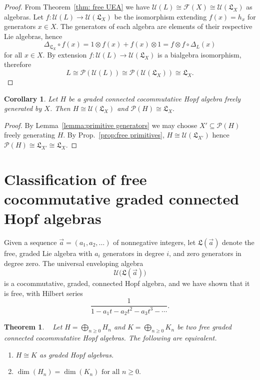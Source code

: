 \documentclass[11pt]{amsart}
\newtheorem{thm}{Theorem}
\newtheorem{corollary}[theorem]{Corollary}
\theoremstyle{definition}
\numberwithin{equation}{section}
\begin{document}
\begin{proof}
   From Theorem~\ref{thm: free UEA} we have $\mathcal{U}(L) \cong \mathcal{F}(X) \cong \mathcal{U}(\mathfrak{L}_X)$ as algebras. Let $f:\mathcal{U}(L) \to \mathcal{U}(\mathfrak{L}_X)$ be the isomorphism extending $f(x)=h_x$ for generators $x \in X$. The generators of each algebra are elements of their respective Lie algebras, hence 
    \[
    \Delta_{\mathfrak{L}_X} \circ f(x)=1 \otimes f(x) + f(x) \otimes 1 = f \otimes f \circ \Delta_L(x) 
    \]
    for all $x \in X$. By extension $f:\mathcal{U}(L) \to \mathcal{U}(\mathfrak{L}_X)$ is a bialgebra isomorphism, therefore
    \[
    L \cong \mathcal{P}(\mathcal{U}(L)) \cong \mathcal{P}(\mathcal{U}(\mathfrak{L}_X)) \cong \mathfrak{L}_X.
    \]
\end{proof}

\begin{corollary}
    Let $H$ be a graded connected cocommutative Hopf algebra freely generated by $X$. Then $H \cong \mathcal{U}(\mathfrak{L}_X)$ and $\mathcal{P}(H)\cong \mathfrak{L}_X.$
\label{cor: free hopf primitives}
\end{corollary}
\begin{proof}
    By Lemma~\ref{lemma:primitive generators} we may choose $X'\subseteq \mathcal{P}(H)$ freely generating $H$. By Prop.~\ref{prop:free primitives}, $H\cong \mathcal{U}(\mathfrak{L}_{X'})$ hence $\mathcal{P}(H)\cong \mathfrak{L}_{X'}\cong \mathfrak{L}_X.$
\end{proof}

\section{Classification of free cocommutative graded connected Hopf algebras} 

Given a sequence $\vec{a} = (a_{1}, a_{2}, \ldots)$ of nonnegative integers, let $\mathfrak{L}(\vec{a})$ denote the free, graded Lie algebra with $a_{i}$ generators in degree $i$, and zero generators in degree zero.  The universal enveloping algebra
\[
\mathcal{U}\big(\mathfrak{L}(\vec{a})\big)
\]
is a cocommutative, graded, connected Hopf algebra, and we have shown that it is free, with Hilbert series
\[
\frac{1}{1 - a_{1}t - a_{2}t^{2} - a_{3}t^{3} - \cdots}.
\]

\begin{thm}~\cite[Theorem 4.2]{AT22}
Let $H=\bigoplus_{n\geq 0} H_n$ and $K=\bigoplus_{n\geq 0} K_n$ be two free graded connected cocommutative Hopf algebras. The following are equivalent.
\begin{enumerate}
\item $H\cong K$ as graded Hopf algebras. 

\item $\dim(H_n)=\dim(K_n) \text{ for all } n\geq 0.$
\end{enumerate}   
\end{thm}
\end{document}
